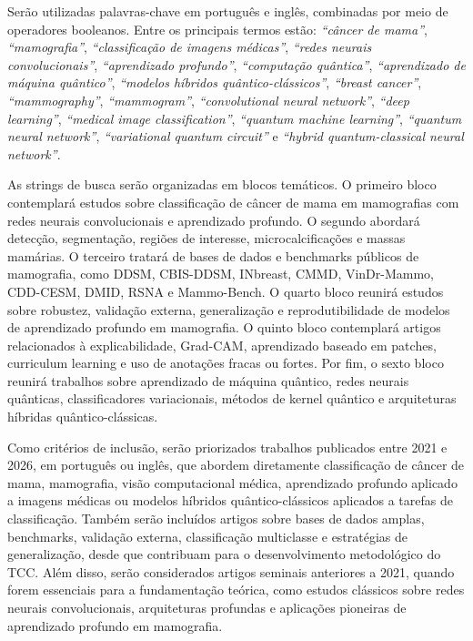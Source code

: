 \documentclass[
    12pt,
    openright,
    oneside,
    a4paper,
    english,
    brazil
]{abntex2}
\begin{document}
Serão utilizadas palavras-chave em português e inglês, combinadas por meio de operadores booleanos. Entre os principais termos estão: \textit{``câncer de mama''}, \textit{``mamografia''}, \textit{``classificação de imagens médicas''}, \textit{``redes neurais convolucionais''}, \textit{``aprendizado profundo''}, \textit{``computação quântica''}, \textit{``aprendizado de máquina quântico''}, \textit{``modelos híbridos quântico-clássicos''}, \textit{``breast cancer''}, \textit{``mammography''}, \textit{``mammogram''}, \textit{``convolutional neural network''}, \textit{``deep learning''}, \textit{``medical image classification''}, \textit{``quantum machine learning''}, \textit{``quantum neural network''}, \textit{``variational quantum circuit''} e \textit{``hybrid quantum-classical neural network''}.

As strings de busca serão organizadas em blocos temáticos. O primeiro bloco contemplará estudos sobre classificação de câncer de mama em mamografias com redes neurais convolucionais e aprendizado profundo. O segundo abordará detecção, segmentação, regiões de interesse, microcalcificações e massas mamárias. O terceiro tratará de bases de dados e benchmarks públicos de mamografia, como DDSM, CBIS-DDSM, INbreast, CMMD, VinDr-Mammo, CDD-CESM, DMID, RSNA e Mammo-Bench. O quarto bloco reunirá estudos sobre robustez, validação externa, generalização e reprodutibilidade de modelos de aprendizado profundo em mamografia. O quinto bloco contemplará artigos relacionados à explicabilidade, Grad-CAM, aprendizado baseado em patches, curriculum learning e uso de anotações fracas ou fortes. Por fim, o sexto bloco reunirá trabalhos sobre aprendizado de máquina quântico, redes neurais quânticas, classificadores variacionais, métodos de kernel quântico e arquiteturas híbridas quântico-clássicas.

Como critérios de inclusão, serão priorizados trabalhos publicados entre 2021 e 2026, em português ou inglês, que abordem diretamente classificação de câncer de mama, mamografia, visão computacional médica, aprendizado profundo aplicado a imagens médicas ou modelos híbridos quântico-clássicos aplicados a tarefas de classificação. Também serão incluídos artigos sobre bases de dados amplas, benchmarks, validação externa, classificação multiclasse e estratégias de generalização, desde que contribuam para o desenvolvimento metodológico do TCC. Além disso, serão considerados artigos seminais anteriores a 2021, quando forem essenciais para a fundamentação teórica, como estudos clássicos sobre redes neurais convolucionais, arquiteturas profundas e aplicações pioneiras de aprendizado profundo em mamografia.
\end{document}
